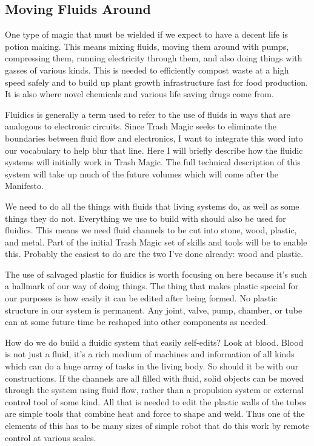 \subsection{Moving Fluids Around}\label{moving-fluids-around}

One type of magic that must be wielded if we expect to have a decent
life is potion making. This means mixing fluids, moving them around with
pumps, compressing them, running electricity through them, and also
doing things with gasses of various kinds. This is needed to efficiently
compost waste at a high speed safely and to build up plant growth
infrastructure fast for food production. It is also where novel
chemicals and various life saving drugs come from.

Fluidics is generally a term used to refer to the use of fluids in ways
that are analogous to electronic circuits. Since Trash Magic seeks to
eliminate the boundaries between fluid flow and electronics, I want to
integrate this word into our vocabulary to help blur that line. Here I
will briefly describe how the fluidic systems will initially work in
Trash Magic. The full technical description of this system will take up
much of the future volumes which will come after the Manifesto.

We need to do all the things with fluids that living systems do, as well
as some things they do not. Everything we use to build with should also
be used for fluidics. This means we need fluid channels to be cut into
stone, wood, plastic, and metal. Part of the initial Trash Magic set of
skills and tools will be to enable this. Probably the easiest to do are
the two I've done already: wood and plastic.

The use of salvaged plastic for fluidics is worth focusing on here
because it's such a hallmark of our way of doing things. The thing that
makes plastic special for our purposes is how easily it can be edited
after being formed. No plastic structure in our system is permanent. Any
joint, valve, pump, chamber, or tube can at some future time be reshaped
into other components as needed.

How do we do build a fluidic system that easily self-edits? Look at
blood. Blood is not just a fluid, it's a rich medium of machines and
information of all kinds which can do a huge array of tasks in the
living body. So should it be with our constructions. If the channels are
all filled with fluid, solid objects can be moved through the system
using fluid flow, rather than a propulsion system or external control
tool of some kind. All that is needed to edit the plastic walls of the
tubes are simple tools that combine heat and force to shape and weld.
Thus one of the elements of this has to be many sizes of simple robot
that do this work by remote control at various scales.


